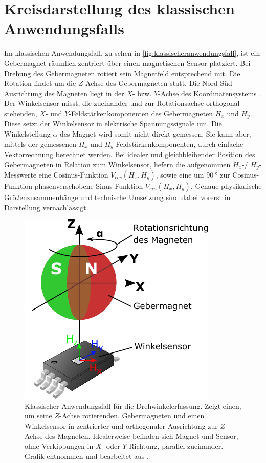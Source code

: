 %

\section{Kreisdarstellung des klassischen Anwendungsfalls}\label{sec:kreisdarstellung-anwendung}


Im klassischen Anwendungsfall, zu sehen in \autoref{fig:klassischeranwendungsfall}, ist ein Gebermagnet räumlich 
zentriert über einen magnetischen Sensor platziert. Bei Drehung des Gebermagneten rotiert sein Magnetfeld entsprechend 
mit. Die Rotation findet um die $Z$-Achse des Gebermagneten statt. Die Nord-Süd-Ausrichtung des Magneten liegt in der 
$X$- bzw. $Y$-Achse des Koordinatensystems \cite{NXPSemiconductors2014}\cite{TDK2016}.
\newline
Der Winkelsensor misst, die zueinander und zur Rotationsachse orthogonal stehenden, $X$- und $Y$-Feldstärkenkomponenten 
des Gebermagneten $H_x$ und $H_y$. Diese setzt der Winkelsensor in elektrische Spannungssignale um. Die Winkelstellung 
$\alpha$ des Magnet wird somit nicht direkt gemessen. Sie kann aber, mittels der gemessenen $H_x$ und $H_y$ 
Feldstärkenkomponenten, durch einfache Vektorrechnung berechnet werden.
\newline
Bei idealer und gleichbleibender Position des Gebermagneten in Relation zum Winkelsensor, liefern die aufgenommen 
$H_x$-/ $H_y$-Messwerte eine Cosinus-Funktion $V_{cos}(H_x,H_y)$, sowie eine um $\SI{90}{\degree}$ zur Cosinus-Funktion 
phasenverschobene Sinus-Funktion $V_{sin}(H_x,H_y)$. Genaue physikalische Größenzusammenhänge und technische Umsetzung 
sind dabei vorerst in Darstellung vernachlässigt. 


\clearpage


\begin{figure}[tph]
	\centering
	\includegraphics[width=0.35\linewidth]{chapters/images/2-Grundlagen/Klassischer_Anwendungsfall}
	\caption[Klassischer Anwendungsfall für die Drehwinkelerfassung]{Klassischer Anwendungsfall für die 
		Drehwinkelerfassung. Zeigt einen, um seine $Z$-Achse rotierenden, Gebermagneten und einen Winkelsensor in 
		zentrierter und orthogonaler Ausrichtung zur $Z$-Achse des Magneten. Idealerweise befinden sich Magnet und 
		Sensor, 
		ohne Verkippungen in $X$- oder $Y$-Richtung, parallel zueinander. Grafik entnommen und bearbeitet aus 
		\cite{Schuethe2020a}.}
	\label{fig:klassischeranwendungsfall}
\end{figure}


